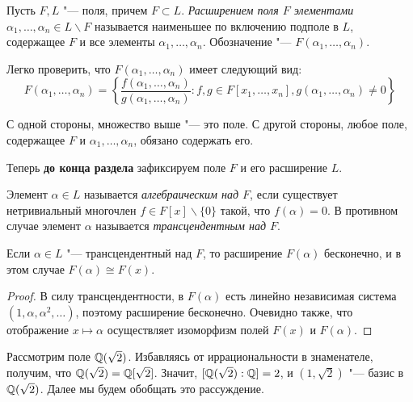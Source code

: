 \begin{definition}
	Пусть $F, L$ "--- поля, причем $F \subset L$. \textit{Расширением поля $F$ элементами} $\alpha_1, \dotsc, \alpha_n \in L \backslash F$ называется наименьшее по включению подполе в $L$, содержащее $F$ и все элементы $\alpha_1, \dotsc, \alpha_n$. Обозначение "--- $F(\alpha_1, \dotsc, \alpha_n)$.
\end{definition}

\begin{note}
	Легко проверить, что $F(\alpha_1, \dotsc, \alpha_n)$ имеет следующий вид:
	\[F(\alpha_1, \dotsc, \alpha_n) = \left\{\frac{f(\alpha_1, \dotsc, \alpha_n)}{g(\alpha_1, \dotsc, \alpha_n)}: f, g \in F[x_1, \dotsc, x_n], g(\alpha_1, \dotsc, \alpha_n) \ne 0\right\}\]
	
	С одной стороны, множество выше "--- это поле. С другой стороны, любое поле, содержащее $F$ и $\alpha_1, \dotsc, \alpha_n$, обязано содержать его.
\end{note}

Теперь \textbf{до конца раздела} зафиксируем поле $F$ и его расширение $L$.

\begin{definition}
	Элемент $\alpha \in L$ называется \textit{алгебраическим над $F$}, если существует нетривиальный многочлен $f \in F[x] \backslash \{0\}$ такой, что $f(\alpha) = 0$. В противном случае элемент $\alpha$ называется \textit{трансцендентным над $F$}.
\end{definition}

\begin{proposition}
	Если $\alpha \in L$ "--- трансцендентный над $F$, то расширение $F(\alpha)$ бесконечно, и в этом случае $F(\alpha) \cong F(x)$.
\end{proposition}

\begin{proof}
	В силу трансцендентности, в $F(\alpha)$ есть линейно независимая система $(1, \alpha, \alpha^2, \dotsc)$, поэтому расширение бесконечно. Очевидно также, что отображение $x \mapsto \alpha$ осуществляет изоморфизм полей $F(x)$ и $F(\alpha)$.
\end{proof}

\begin{example}
	Рассмотрим поле $\mathbb{Q}(\sqrt{2})$. Избавляясь от иррациональности в знаменателе, получим, что $\mathbb{Q}(\sqrt{2}) = \mathbb{Q}[\sqrt{2}]$. Значит, $[\mathbb{Q}(\sqrt{2}) : \mathbb{Q}] = 2$, и $(1, \sqrt{2})$ "--- базис в $\mathbb{Q}(\sqrt{2})$. Далее мы будем обобщать это рассуждение.
\end{example}

